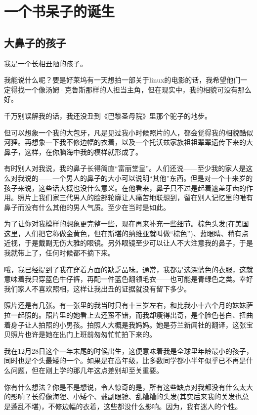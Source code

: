 \chapter{一个书呆子的诞生}
\section{大鼻子的孩子}

我是一个长相丑陋的孩子。

我能说什么呢？要是好莱坞有一天想拍一部关于linux的电影的话，我希望他们一定得找一个像汤姆·克鲁斯那样的人担当主角，但在现实中，我的相貌可没有那么好。

千万别误解我的话，我还没丑到《巴黎圣母院》里那个驼子的地步。

但可以想象一个我的大包牙，凡是见过我小时候照片的人，都会觉得我的相貌酷似河狸。再想象一下我不修边幅的衣着，以及一个托沃兹家族祖祖辈辈遗传下来的大鼻子，这样，在你脑海中我的模样就形成了。

有时别人对我说，我的鼻子长得简直“富丽堂皇”。人们还说——至少我的家人是这么对我说的——一个男人的鼻子的大小可以说明“其他”东西。但是对一个十来岁的孩子来说，这些话大概也没什么意义。在他看来，鼻子只不过是起着遮盖牙齿的作用。照片上我们家三代男人的脸部轮廓让人痛苦地联想到，留在别人记忆里的唯有鼻子而没有什么其他的男人气质。至少在当时是如此。

为了让你对我模样的想象更完整一些，现在再来补充一些细节。棕色头发(在美国这里，人们把它称做金黄色，但在斯堪的纳维亚就叫做“棕色”)、蓝眼睛、稍有点近视，于是戴副无伤大雅的眼镜。另外眼镜至少可以让人不大注意我的鼻子，于是我就带上了，任何时候都不摘下来。

哦，我已经提到了我在穿着方面的缺乏品味。通常，我都是选深蓝色的衣服，这就意味着我只穿蓝色牛仔裤，再配一件蓝色翻领毛衣——也可能是青绿色之类。幸好我们家人不喜欢照相，这样让我出丑的证据就没有留下多少。

照片还是有几张。有一张里的我当时只有十三岁左右，和比我小十六个月的妹妹萨拉一起照的。照片里的她看上去还蛮不错，而我却瘦得出奇，是个脸色苍白、扭曲着身子让人拍照的小男孩。拍照人大概是我妈妈。她是芬兰新闻社的翻译，这张宝贝照片也许是她在出门上班前匆匆忙忙拍下来的。

我在12月28日这个一年末尾的时候出生，这便意味着我是全球里年龄最小的孩子，同时也是个头最矮的一个。如果是在高年级，比多数同学都小半年似乎已不再是什么问题，但在刚上学的那几年这点差别却至关重要。

你有什么想法？你是不是想说，令人惊奇的是，所有这些缺点对我都没有什么太大的影响？长得像海狸、小矮个、戴副眼镜、乱糟糟的头发(其实后来我的关发也总是蓬乱不堪)，不修边幅的衣着，这些都没什么影响。因为，我有迷人的个性。

